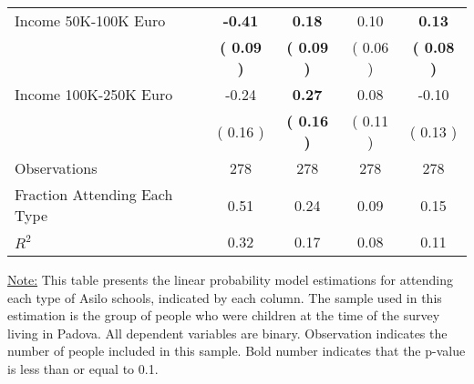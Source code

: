 \begin{table}[H]
{\begin{tabular}{lcccc}
\quad Income 50K-100K Euro & \textbf{    -0.41} & \textbf{     0.18} &      0.10 & \textbf{     0.13} \\
\quad  & \textbf{(     0.09 )} & \textbf{(     0.09 )}  & (     0.06 )  & \textbf{(     0.08 )}  \\
\quad Income 100K-250K Euro &     -0.24 & \textbf{     0.27} &      0.08 &     -0.10 \\
\quad  & (     0.16 ) & \textbf{(     0.16 )}  & (     0.11 )  & (     0.13 )  \\
\midrule
Observations & 278 & 278 & 278 & 278 \\
Fraction Attending Each Type &      0.51 &      0.24 &      0.09 &      0.15 \\
\midrule
$ R^2$ &      0.32 &      0.17 &      0.08 &      0.11 \\
\bottomrule
\end{tabular}}
\end{table}
\begin{footnotesize}
\noindent\underline{Note:} This table presents the linear probability model estimations for attending each type of Asilo schools, indicated by each column. The sample used in this estimation is the group of people who were children at the time of the survey living in Padova. All dependent variables are binary. Observation indicates the number of people included in this sample. Bold number indicates that the p-value is less than or equal to 0.1.
\end{footnotesize}
